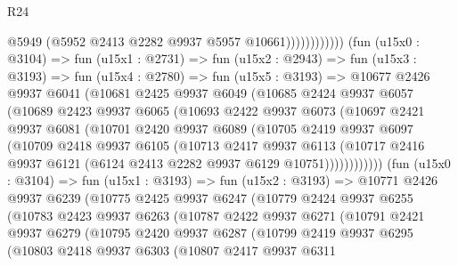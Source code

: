 \begin{lexlean}{R24}
\begin{coremodule}
                              @5949
                              (@5952 @2413 @2282 @9937 @5957 @10661))))))))))))
        (fun (u15x0 : @3104) =>
        fun (u15x1 : @2731) =>
        fun (u15x2 : @2943) =>
        fun (u15x3 : @3193) =>
        fun (u15x4 : @2780) =>
        fun (u15x5 : @3193) =>
        @10677
          @2426
          @9937
          @6041
          (@10681
            @2425
            @9937
            @6049
            (@10685
              @2424
              @9937
              @6057
              (@10689
                @2423
                @9937
                @6065
                (@10693
                  @2422
                  @9937
                  @6073
                  (@10697
                    @2421
                    @9937
                    @6081
                    (@10701
                      @2420
                      @9937
                      @6089
                      (@10705
                        @2419
                        @9937
                        @6097
                        (@10709
                          @2418
                          @9937
                          @6105
                          (@10713
                            @2417
                            @9937
                            @6113
                            (@10717
                              @2416
                              @9937
                              @6121
                              (@6124 @2413 @2282 @9937 @6129 @10751))))))))))))
        (fun (u15x0 : @3104) =>
        fun (u15x1 : @3193) =>
        fun (u15x2 : @3193) =>
        @10771
          @2426
          @9937
          @6239
          (@10775
            @2425
            @9937
            @6247
            (@10779
              @2424
              @9937
              @6255
              (@10783
                @2423
                @9937
                @6263
                (@10787
                  @2422
                  @9937
                  @6271
                  (@10791
                    @2421
                    @9937
                    @6279
                    (@10795
                      @2420
                      @9937
                      @6287
                      (@10799
                        @2419
                        @9937
                        @6295
                        (@10803
                          @2418
                          @9937
                          @6303
                          (@10807
                            @2417
                            @9937
                            @6311

\end{coremodule}
\end{lexlean}
